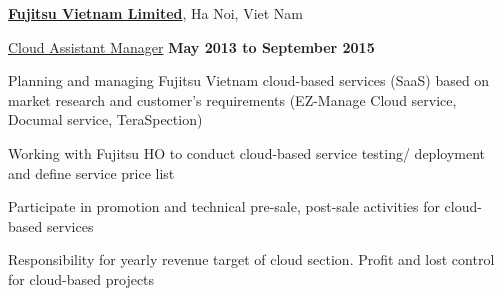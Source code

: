\documentclass[10pt]{article}
\renewcommand\textit[1]{\underline{#1}}
\newcommand{\halfblankline}{\quad\vspace{-0.5\baselineskip}\pagebreak[3]}
\begin{document}
\href{http://fujitsu.com/vn/en/}{\textbf{Fujitsu Vietnam Limited}}, Ha Noi, Viet Nam
\begin{outerlist}

    \item[] \textit{Cloud Assistant Manager}%
            \hfill \textbf{May 2013 to September 2015}\\
            \begin{innerlist}

                \item Planning and managing  Fujitsu Vietnam  cloud-based  services (SaaS) based  on market  research and customer's requirements  (EZ-Manage  Cloud  service,   Documal  service, TeraSpection)

                \item Working  with  Fujitsu HO  to  conduct  cloud-based  service  testing/ deployment  and  define service  price  list

                \item  Participate  in  promotion and  technical pre-sale, post-sale  activities  for  cloud-based  services

	     \item  Responsibility for yearly revenue target of cloud section.  Profit and lost control for cloud-based  projects

            \end{innerlist}

\end{outerlist}

\halfblankline
\end{document}
